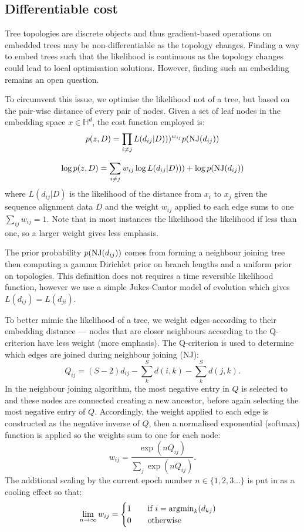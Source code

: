 \documentclass[11pt, twocolumn]{article}
\DeclareMathOperator*{\argmin}{argmin}
\newcommand{\be}{\begin{equation*}}
\newcommand{\ee}{\end{equation*}}
\begin{document}
\subsection{Differentiable cost}
Tree topologies are discrete objects and thus gradient-based operations on embedded trees may be non-differentiable as the topology changes.
Finding a way to embed trees such that the likelihood is continuous as the topology changes could lead to local optimisation solutions.
However, finding such an embedding remains an open question.

To circumvent this issue, we optimise the likelihood not of a tree, but based on the pair-wise distance of every pair of nodes.
Given a set of leaf nodes in the embedding space $x \in \mathbb{H}^{d}$, the cost function employed is:
\begin{equation}
p(z, D) = \prod_{i \neq j} L(d_{ij}|D)))^{w_{ij}}  p(\textnormal{NJ}(d_{ij}))
\end{equation}

\begin{equation}
\log p(z, D) = \sum_{i \neq j} w_{ij} \log L(d_{ij}|D))) + \log p(\textnormal{NJ}(d_{ij}))
\end{equation}
\noindent where $L(d_{ij}|D)$ is the likelihood of the distance from $x_{i}$ to $x_{j}$ given the sequence alignment data $D$ and the weight $w_{ij}$ applied to each edge sums to one $\sum_{ij} w_{ij} = 1$.
Note that in most instances the likelihood the likelihood if less than one, so a larger weight gives less emphasis.

The prior probability $p(\textnormal{NJ}(d_{ij}))$ comes from forming a neighbour joining tree then computing a gamma Dirichlet prior on branch lengths and a uniform prior on topologies.
This definition does not requires a time reversible likelihood function, however we use a simple Jukes-Cantor model of evolution which gives $L(d_{ij})=L(d_{ji})$.

To better mimic the likelihood of a tree, we weight edges according to their embedding distance --- nodes that are closer neighbours according to the Q-criterion have less weight (more emphasis).
The Q-criterion is used to determine which edges are joined during neighbour joining (NJ): 
\be
Q_{ij} = (S-2)d_{ij} - \sum_{k}^{S}d(i, k) - \sum_{k}^{S}d(j, k).
\ee
In the neighbour joining algorithm, the most negative entry in $Q$ is selected to and these nodes are connected creating a new ancestor, before again selecting the most negative entry of $Q$.
Accordingly, the weight applied to each edge is constructed as the negative inverse of $Q$, then a normalised exponential (softmax) function is applied so the weights sum to one for each node:
\be
w_{ij} = \frac{\exp(n Q_{ij})}{\sum_{j} \exp(n Q_{ij})}.
\ee
The additional scaling by the current epoch number $n \in \{1,2,3...\}$ is put in as a cooling effect so that:
\be
\lim_{n\to\infty} w_{ij} = 
\begin{cases}
1 \qquad \textnormal{if } i = \argmin_{k}(d_{kj}) \\
0 \qquad \textnormal{otherwise}
\end{cases}
\ee
\end{document}
